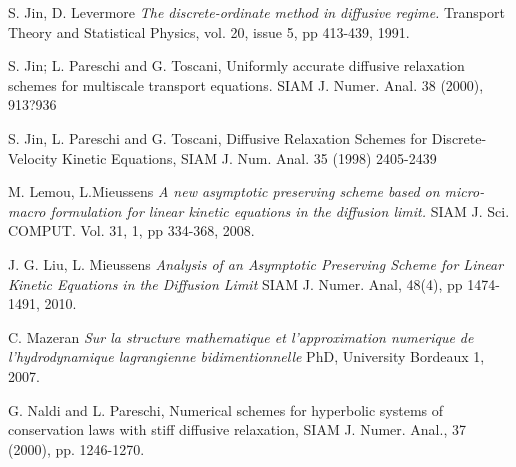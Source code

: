 \documentclass[a4paper,french,english,10pt]{article}
\begin{document}
{\begin{thebibliography}{abcde}
 S. Jin, D. Levermore \emph{The discrete-ordinate method in
diffusive regime.} Transport Theory and Statistical Physics, vol. 20, issue 5,
pp 413-439, 1991.




 S. Jin; L. Pareschi and G. Toscani, Uniformly accurate diffusive relaxation schemes
for multiscale transport equations. SIAM J. Numer. Anal. 38 (2000), 913?936

S. Jin, L. Pareschi and G. Toscani, Diffusive Relaxation Schemes for Discrete-
Velocity Kinetic Equations, SIAM J. Num. Anal. 35 (1998) 2405-2439

 M. Lemou, L.Mieussens \emph{A new asymptotic preserving
scheme based on micro-macro formulation for linear kinetic equations in the
diffusion limit.} SIAM J. Sci. COMPUT. Vol. 31, 1, pp 334-368, 2008.

 J. G. Liu, L. Mieussens \emph{Analysis of an Asymptotic
Preserving Scheme for Linear Kinetic Equations in the Diffusion Limit} SIAM J.
Numer. Anal,  48(4), pp 1474-1491, 2010.

 C. Mazeran \emph{Sur la structure mathematique et
l'approximation numerique de l'hydrodynamique lagrangienne bidimentionnelle}
 PhD, University Bordeaux 1, 2007.
 
 
G. Naldi and L. Pareschi, Numerical schemes for hyperbolic systems of conservation
laws with stiff diffusive relaxation, SIAM J. Numer. Anal., 37 (2000), pp.
1246-1270.
 
\end{thebibliography}

}
\end{document}
